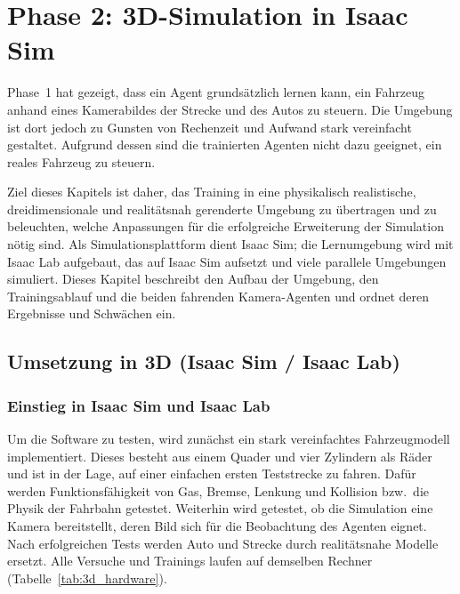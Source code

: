 \chapter{Phase 2: 3D-Simulation in Isaac Sim}
\label{chap:phase2}

Phase~1 hat gezeigt, dass ein Agent grundsätzlich lernen kann, ein Fahrzeug anhand eines Kamerabildes der Strecke und des Autos zu steuern. Die Umgebung ist dort jedoch zu Gunsten von Rechenzeit und Aufwand stark vereinfacht gestaltet. Aufgrund dessen sind die trainierten Agenten nicht dazu geeignet, ein reales Fahrzeug zu steuern.

Ziel dieses Kapitels ist daher, das Training in eine physikalisch realistische, dreidimensionale und realitätsnah gerenderte Umgebung zu übertragen und zu beleuchten, welche Anpassungen für die erfolgreiche Erweiterung der Simulation nötig sind. Als Simulationsplattform dient Isaac Sim; die Lernumgebung wird mit Isaac Lab \cite{nvidia_isaaclab} aufgebaut, das auf Isaac Sim aufsetzt und viele parallele Umgebungen simuliert. Dieses Kapitel beschreibt den Aufbau der Umgebung, den Trainingsablauf und die beiden fahrenden Kamera-Agenten und ordnet deren Ergebnisse und Schwächen ein.

\section{Umsetzung in 3D (Isaac Sim / Isaac Lab)}
\label{sec:umsetzung3d}

\subsection{Einstieg in Isaac Sim und Isaac Lab}
\label{sec:3d_einstieg}

Um die Software zu testen, wird zunächst ein stark vereinfachtes Fahrzeugmodell implementiert. Dieses besteht aus einem Quader und vier Zylindern als Räder und ist in der Lage, auf einer einfachen ersten Teststrecke zu fahren. Dafür werden Funktionsfähigkeit von Gas, Bremse, Lenkung und Kollision bzw.\ die Physik der Fahrbahn getestet. Weiterhin wird getestet, ob die Simulation eine Kamera bereitstellt, deren Bild sich für die Beobachtung des Agenten eignet. Nach erfolgreichen Tests werden Auto und Strecke durch realitätsnahe Modelle ersetzt. Alle Versuche und Trainings laufen auf demselben Rechner (Tabelle~\ref{tab:3d_hardware}).

